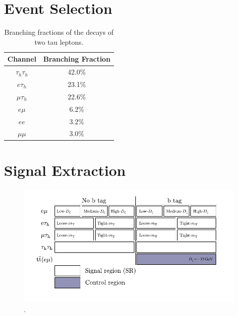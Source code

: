\section{Event Selection}

\begin{table}[h]
    \centering
    \begin{tabular}{|c|c|}
         \hline
         Channel & Branching Fraction  \\
         \hline
         \hline
         $\tau_h \tau_h$ & 42.0\% \\
         $e \tau_h$ & 23.1\% \\
         $\mu \tau_h$ & 22.6\% \\
         $e \mu$ & 6.2\% \\
         $e e$ & 3.2\% \\
         $\mu \mu$ & 3.0\% \\
         \hline
    \end{tabular}
    \caption{Branching fractions of the decays of two tau leptons.}
\end{table}

\section{Signal Extraction}

\begin{figure}[!hbtp]
\centering
    \includegraphics[width=1.0\textwidth]{Figures/high_mass_categories.pdf}
\caption{.}
\label{fig:high_mass_categories}
\end{figure}

